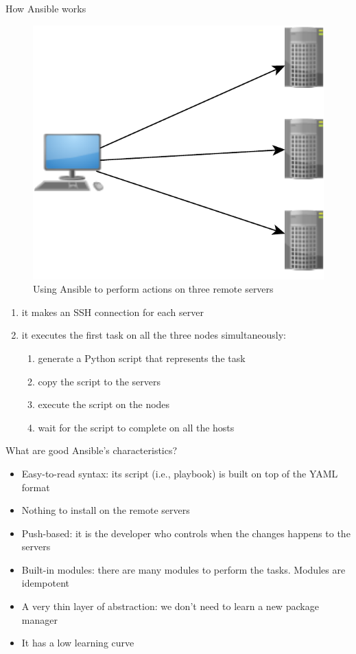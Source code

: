 \documentclass[xcolor=dvipsnames,slidestop, mathserif]{beamer}
\begin{document}
\begin{frame}{How Ansible works}
\vspace{-0.5cm}
  \begin{figure}
     \centering
     \includegraphics[width=.4\columnwidth]{ansible-working-example}
     \caption{Using Ansible to perform actions on three remote servers}
  \end{figure}

  \begin{enumerate}
    \item it makes an SSH connection for each server
    \item it executes the first task on all the three nodes simultaneously:
       \begin{enumerate}
          \item generate a Python script that represents the task
          \item copy the script to the servers
          \item execute the script on the nodes
          \item wait for the script to complete on all the hosts
       \end{enumerate}
  \end{enumerate}
\end{frame}

\begin{frame}{What are good Ansible's characteristics?}
   \begin{itemize}
     \item Easy-to-read syntax: its script (i.e., playbook) is built on top of the YAML format
     \item Nothing to install on the remote servers
     \item Push-based: it is the developer who controls when the changes happens to the servers
     \item Built-in modules: there are many modules to perform the tasks. Modules are idempotent
     \item A very thin layer of abstraction: we don't need to learn a new package manager
     \item It has a low learning curve
   \end{itemize}
\end{frame}
\end{document}
